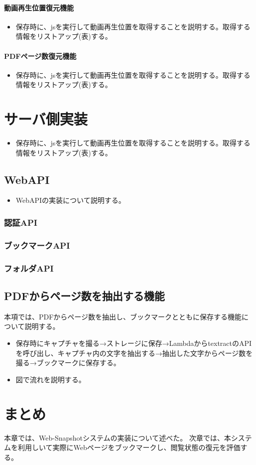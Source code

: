\paragraph{動画再生位置復元機能}
\begin{itemize}
  \item 保存時に、jsを実行して動画再生位置を取得することを説明する。取得する情報をリストアップ(表)する。
\end{itemize}

\paragraph{PDFページ数復元機能}
\begin{itemize}
  \item 保存時に、jsを実行して動画再生位置を取得することを説明する。取得する情報をリストアップ(表)する。
\end{itemize}

\section{サーバ側実装}
\begin{itemize}
  \item 保存時に、jsを実行して動画再生位置を取得することを説明する。取得する情報をリストアップ(表)する。
\end{itemize}

\subsection{WebAPI}
\begin{itemize}
  \item WebAPIの実装について説明する。
\end{itemize}

\subsubsection{認証API}
\subsubsection{ブックマークAPI}
\subsubsection{フォルダAPI}

\subsection{PDFからページ数を抽出する機能}
本項では、PDFからページ数を抽出し、ブックマークとともに保存する機能について説明する。

\begin{itemize}
  \item 保存時にキャプチャを撮る→ストレージに保存→LambdaからtextractのAPIを呼び出し、キャプチャ内の文字を抽出する→抽出した文字からページ数を撮る→ブックマークに保存する。
  \item 図で流れを説明する。
\end{itemize}

\section{まとめ}
本章では、Web-Snapshotシステムの実装について述べた。
次章では、本システムを利用しいて実際にWebページをブックマークし、閲覧状態の復元を評価する。